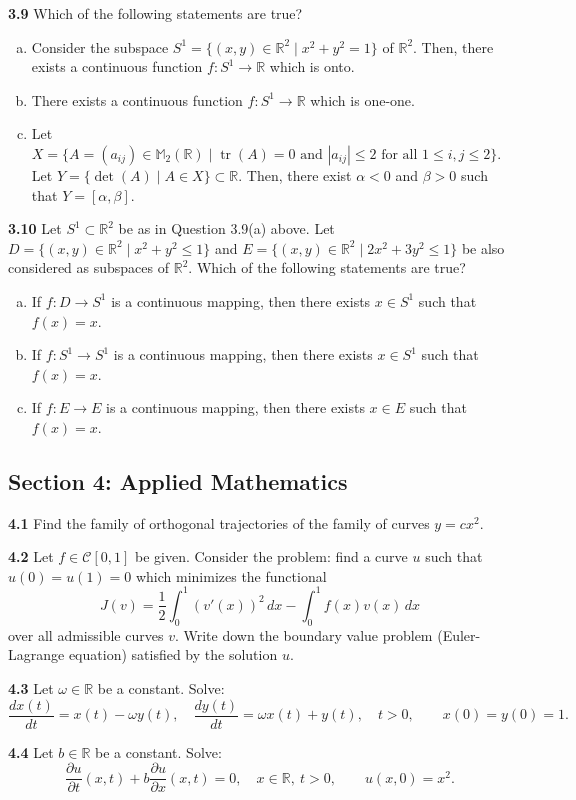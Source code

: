 \documentclass[11pt,a4paper]{article}
\newcommand{\R}{\mathbb{R}}
\newcommand{\M}{\mathbb{M}}
\newcommand{\tr}{\operatorname{tr}}
\newcommand{\examsec}[1]{%
  \subsection*{#1}
  \vspace{-2pt}
}
\newcommand{\qitem}[1]{\par\medskip\noindent\textbf{#1}\hspace{0.5em}}
\begin{document}
\qitem{3.9} Which of the following statements are true?
\begin{enumerate}[a.]
  \item Consider the subspace $S^1 = \{(x, y) \in \R^2 \mid x^2 + y^2 = 1\}$ of $\R^2$. Then, there exists a continuous function $f : S^1 \to \R$ which is onto.
  \item There exists a continuous function $f : S^1 \to \R$ which is one-one.
  \item Let $X = \{A = (a_{ij}) \in \M_2(\R) \mid \tr(A) = 0 \text{ and } |a_{ij}| \le 2 \text{ for all } 1 \le i, j \le 2\}$. Let $Y = \{\det(A) \mid A \in X\} \subset \R$. Then, there exist $\alpha < 0$ and $\beta > 0$ such that $Y = [\alpha, \beta]$.
\end{enumerate}

\qitem{3.10} Let $S^1 \subset \R^2$ be as in Question 3.9(a) above. Let $D = \{(x, y) \in \R^2 \mid x^2 + y^2 \le 1\}$ and $E = \{(x, y) \in \R^2 \mid 2x^2 + 3y^2 \le 1\}$ be also considered as subspaces of $\R^2$. Which of the following statements are true?
\begin{enumerate}[a.]
  \item If $f : D \to S^1$ is a continuous mapping, then there exists $x \in S^1$ such that $f(x) = x$.
  \item If $f : S^1 \to S^1$ is a continuous mapping, then there exists $x \in S^1$ such that $f(x) = x$.
  \item If $f : E \to E$ is a continuous mapping, then there exists $x \in E$ such that $f(x) = x$.
\end{enumerate}

\examsec{Section 4: Applied Mathematics}

\qitem{4.1} Find the family of orthogonal trajectories of the family of curves $y = cx^2$.

\qitem{4.2} Let $f \in \mathcal{C}[0, 1]$ be given. Consider the problem: find a curve $u$ such that $u(0) = u(1) = 0$ which minimizes the functional
\[
  J(v) = \frac{1}{2}\int_0^1 (v'(x))^2\,dx - \int_0^1 f(x)v(x)\,dx
\]
over all admissible curves $v$. Write down the boundary value problem (Euler-Lagrange equation) satisfied by the solution $u$.

\qitem{4.3} Let $\omega \in \R$ be a constant. Solve:
\[
  \frac{dx(t)}{dt} = x(t) - \omega y(t),\quad \frac{dy(t)}{dt} = \omega x(t) + y(t),\quad t > 0,\qquad x(0) = y(0) = 1.
\]

\qitem{4.4} Let $b \in \R$ be a constant. Solve:
\[
  \frac{\partial u}{\partial t}(x, t) + b\frac{\partial u}{\partial x}(x, t) = 0,\quad x \in \R,\ t > 0,\qquad u(x, 0) = x^2.
\]
\end{document}
